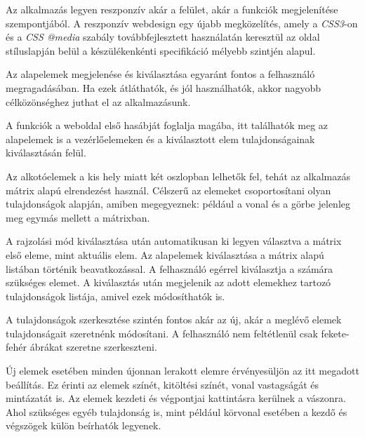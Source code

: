 Az alkalmazás legyen reszponzív akár a felület, akár a funkciók megjelenítése szempontjából. A reszponzív webdesign egy újabb megközelítés, amely a \textit{CSS3}-on és a \textit{CSS @media} szabály továbbfejlesztett használatán keresztül az oldal stíluslapján belül a készülékenkénti specifikáció mélyebb szintjén alapul. 


Az alapelemek megjelenése és kiválasztása egyaránt fontos a felhasználó megragadásában. Ha ezek átláthatók, és jól használhatók, akkor nagyobb célközönséghez juthat el az alkalmazásunk.


A funkciók a weboldal első hasábját foglalja magába, itt találhatók meg az alapelemek is a vezérlőelemeken és a kiválasztott elem tulajdonságainak kiválasztásán felül.  

Az alkotóelemek a kis hely miatt két oszlopban lelhetők fel, tehát az alkalmazás mátrix alapú elrendezést használ. Célszerű az elemeket csoportosítani olyan tulajdonságok alapján, amiben megegyeznek: például a vonal és a görbe jelenleg meg egymás mellett a mátrixban. 


A rajzolási mód kiválasztása után automatikusan ki legyen választva a mátrix első eleme, mint aktuális elem. Az alapelemek kiválasztása a mátrix alapú listában történik beavatkozással. A felhasználó egérrel kiválasztja a számára szükséges elemet. A kiválasztás után megjelenik az adott elemekhez tartozó tulajdonságok listája, amivel ezek módosíthatók is.


A tulajdonságok szerkesztése szintén fontos akár az új, akár a meglévő elemek tulajdonságait szeretnénk módosítani. A felhasználó nem feltétlenül csak fekete-fehér ábrákat szeretne szerkeszteni.


Új elemek esetében minden újonnan lerakott elemre érvényesüljön az itt megadott beállítás. Ez érinti az elemek színét, kitöltési színét, vonal vastagságát és mintázatát is. Az elemek kezdeti és végpontjai kattintásra kerülnek a vászonra. Ahol szükséges egyéb tulajdonság is, mint például körvonal esetében a kezdő és végszögek külön beírhatók legyenek.


